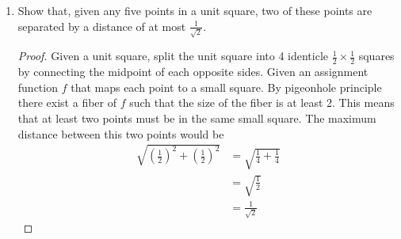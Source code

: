 \documentclass{article}
\begin{document}
\begin{enumerate} [label=(\arabic*)]
\begin{proof}
			\paragraph{Case 1: G is a connected finite simple graph }
				Suppose $|V|=n$, the vertex set contains vertices $\{v_1,\ v_2,\dots
				v_n\}$, the set of degrees for each vertex contains $\{1,\ 2, \dots
				n-1\}$. $0$ is not in the possible degree set since the graph is
				connected.\\
				By Pigeonhole Principle, there exist a fiber of the function 
				$f:V \mapsto deg(V)$ that is of size at least $2$. This means that there
				exist at least two people with the same number of ``known people.''
			\paragraph{Case 2: G is not a connected graph }If G is a empty graph, then
			everyone has 0 ``known people'' which satisifies the condition. If there
			exist edges in the graph, isolate each connected graph and based on
			\textbf{Case 1}, there exist two people with the same number of ``known
			people.''
		\end{proof}
		
	\item Show that, given any five points in a unit square, two of these points
		are separated by a distance of at most $\frac{1}{\sqrt{2}}$.\\
		\begin{proof}
			Given a unit square, split the unit square into 4 identicle
			$\frac{1}{2} \times \frac{1}{2}$ squares by connecting the midpoint of
			each opposite sides. Given an assignment function $f$ that maps each point
			to a small square. By pigeonhole principle there exist a fiber of $f$ such
			that the size of the fiber is at least 2. This means that at least two
			points must be in the same small square. The maximum distance between this
			two points would be 
			\begin{align*}
			\sqrt{\left(\frac{1}{2}\right)^2 + \left(\frac{1}{2}\right)^2} 
			&= \sqrt{\frac{1}{4} + \frac{1}{4}}\\
			&= \sqrt{\frac{1}{2}}\\
			&= \frac{1}{\sqrt{2}}
			\end{align*}
		\end{proof}
		
\end{enumerate}
\end{document}
